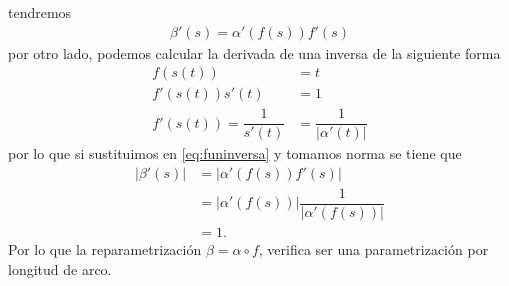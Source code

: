 \documentclass[oneside,11pt]{memoir}
\begin{document}
tendremos
\begin{align}
    \beta'(s)=\alpha'(f(s))f'(s) \label{eq:funinversa}
\end{align}
por otro lado, podemos calcular la derivada de una inversa de la siguiente forma
\begin{align*}
    f(s(t))&=t\\
    f'(s(t))s'(t)&=1\\
    f'(s(t))=\dfrac{1}{s'(t)}&=\dfrac{1}{|\alpha'(t)|}
\end{align*}
por lo que si sustituimos en \ref{eq:funinversa} y tomamos norma se tiene que
\begin{align*}
    |\beta'(s)|&=|\alpha'(f(s))f'(s)|\\
    &=\left|\alpha'(f(s))\right|\dfrac{1}{|\alpha'(f(s))|}\\
    &=1.
\end{align*}
Por lo que la reparametrización $\beta=\alpha\circ f$, verifica ser una parametrización por longitud de arco.\\
\end{document}
